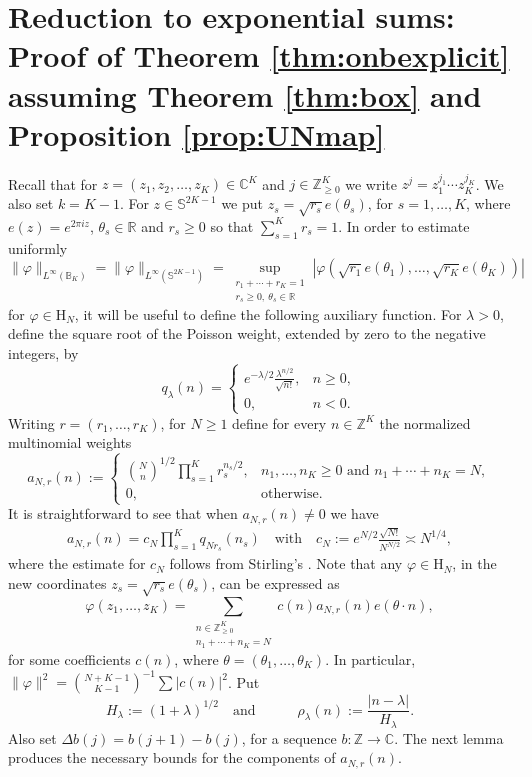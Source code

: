 \documentclass[a4paper,reqno,12pt]{amsart}
\theoremstyle{plain}
\theoremstyle{plain}
\theoremstyle{remark}
\theoremstyle{plain}
\newcommand{\PolySpace}{\mathrm{H}}
\newcommand{\z}{\mathbb{Z}}
\newcommand{\RR}{\mathbb{R}}
\newcommand{\cp}{\mathbb{C}} %
\newcommand{\p}{\varphi}
\newcommand{\Sphere}{\mathbb{S}}
\newcommand{\Z}{\mathbb{Z}}
\theoremstyle{plain}
\theoremstyle{plain}
\begin{document}
{\section{Reduction to exponential sums: Proof of Theorem \ref{thm:onbexplicit} assuming Theorem \ref{thm:box} and Proposition \ref{prop:UNmap}}\label{part:one}
Recall that for $z=(z_1,z_2,\ldots,z_K) \in \cp^K$ and $j\in \z_{\geq 0}^K$ we write $z^j=z_1^{j_1}\cdots z_K^{j_K}$. We also set $k=K-1$. 
For $z \in \Sphere^{2K - 1}$ we {put} $z_s = \sqrt{r_s} e(\theta_s)$, for $s=1,{\ldots},K$, where $e(z)=e^{2\pi i z}$,  $\theta_s\in \RR$ and $r_s \geq 0$ so that $\sum_{s=1}^K r_s = 1$. In order to estimate uniformly
\[
\|\p\|_{L^\infty(\mathbb B_K)} = \|\p\|_{L^\infty(\Sphere^{2K-1})} = \sup_{\substack{r_1+\cdots+r_{K}=1 \\ r_s\geq 0, \ \theta_s \in \RR}} |\p( \sqrt{r_1} e(\theta_1),\ldots,\sqrt{r_K} e(\theta_K))|
\]
for $\p \in {\PolySpace_N}$, it will be useful to define the following auxiliary function.  For $\lambda>0$, define the square root of the Poisson
weight, extended by zero to the negative integers, by
\[
q_\lambda(n)=
\begin{cases}
\displaystyle e^{-\lambda/2}\frac{\lambda^{n/2}}{\sqrt{n!}},&n\geq0,\\[5pt]
0,&n<0.
\end{cases}
\]
Writing $r=(r_1,{\ldots},r_K)$, {for $N\ge1$} define for every $n\in\z^K$ the normalized multinomial weights
\[
a_{N,r}(n):=
\begin{cases}
\binom Nn^{1/2}\prod_{s=1}^Kr_s^{n_s/2},&n_1,{\ldots},n_K\ge0 \text{ and  } n_1+\cdots+n_K=N,\\[4pt]
0,&\text{otherwise}.
\end{cases}
\]
It is straightforward to see that when $a_{N,r}(n) \neq 0$ we have
\begin{align}
a_{N,r}(n)=c_N\prod_{s=1}^Kq_{Nr_s}(n_s)
\quad \text{with} \quad
c_N:=e^{N/2}\frac{\sqrt{N!}}{N^{N/2}}\asymp N^{1/4},
\label{eq:poissonFactorizationMultinomial}
\end{align}
where the estimate for $c_N$ follows from Stirling's \cite[Section~5.11]{DLMF}. Note that any $\p \in {\PolySpace_N}$, in the new coordinates $z_s = \sqrt{r_s} e(\theta_s)$, can be {expressed} as
\[
\p(z_1,\ldots,z_K) = \sum_{\substack{n \in \Z_{\geq 0}^K  \\  n_1+\cdots+n_K=N}} c(n) a_{N,r}(n) e(\theta \cdot n),
\]
for some coefficients $c(n)$, where $\theta = (\theta_1,\ldots,\theta_K)$. In particular, $\|\p\|^2 = \binom{N+K-1}{K-1}^{-1} \sum  |c(n)|^2$.  Put
\[
H_\lambda:=(1+\lambda)^{1/2}  \quad \text{and} \quad
\qquad \rho_\lambda(n):=\frac{|n-\lambda|}{H_\lambda}.
\]
{Also set} $\Delta b(j)=b(j+1)-b(j)$, for a sequence $b:\Z\to \cp$.  The next lemma produces the necessary bounds for the components of $a_{N,r}(n)$.

}
\end{document}
